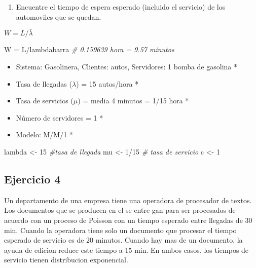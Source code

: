 \documentclass[
]{article}
\newenvironment{Shaded}{\begin{snugshade}}{\end{snugshade}}
\newcommand{\CommentTok}[1]{\textcolor[rgb]{0.56,0.35,0.01}{\textit{#1}}}
\newcommand{\DecValTok}[1]{\textcolor[rgb]{0.00,0.00,0.81}{#1}}
\newcommand{\NormalTok}[1]{#1}
\newcommand{\OtherTok}[1]{\textcolor[rgb]{0.56,0.35,0.01}{#1}}
\newcommand{\SpecialCharTok}[1]{\textcolor[rgb]{0.00,0.00,0.00}{#1}}
\providecommand{\tightlist}{%
  \setlength{\itemsep}{0pt}\setlength{\parskip}{0pt}}
\begin{document}
\begin{enumerate}
\def\labelenumi{\alph{enumi})}
\setcounter{enumi}{1}
\tightlist
\item
  Encuentre el tiempo de espera esperado (incluido el servicio) de los
  automoviles que se quedan.
\end{enumerate}

\(W = L/\bar\lambda\)

\begin{Shaded}
\begin{Highlighting}[]
\NormalTok{W }\OtherTok{=}\NormalTok{ L}\SpecialCharTok{/}\NormalTok{lambdabarra }\CommentTok{\# 0.159639 hora = 9.57 minutos}
\end{Highlighting}
\end{Shaded}

\begin{itemize}
\item
  Sistema: Gasolinera, Clientes: autos, Servidores: 1 bomba de gasolina
  *
\item
  Tasa de llegadas (\(\lambda\)) = 15 autos/hora *
\item
  Tasa de servicios (\(\mu\)) = media 4 minutos = 1/15 hora *
\item
  Número de servidores = 1 *
\item
  Modelo: M/M/1 *
\end{itemize}

\begin{Shaded}
\begin{Highlighting}[]
\NormalTok{lambda }\OtherTok{\textless{}{-}} \DecValTok{15} \CommentTok{\#tasa de llegada}
\NormalTok{mu }\OtherTok{\textless{}{-}} \DecValTok{1}\SpecialCharTok{/}\DecValTok{15} \CommentTok{\# tasa de servicio}
\NormalTok{c }\OtherTok{\textless{}{-}} \DecValTok{1} 
\end{Highlighting}
\end{Shaded}

\hypertarget{ejercicio-4}{%
\subsection{Ejercicio 4}\label{ejercicio-4}}

Un departamento de una empresa tiene una operadora de procesador de
textos. Los documentos que se producen en el se entre-gan para ser
procesados de acuerdo con un proceso de Poisson con un tiempo esperado
entre llegadas de 30 min. Cuando la operadora tiene solo un documento
que procesar el tiempo esperado de servicio es de 20 minutos. Cuando hay
mas de un documento, la ayuda de edicion reduce este tiempo a 15 min. En
ambos casos, los tiempos de servicio tienen distribucion exponencial.
\end{document}
